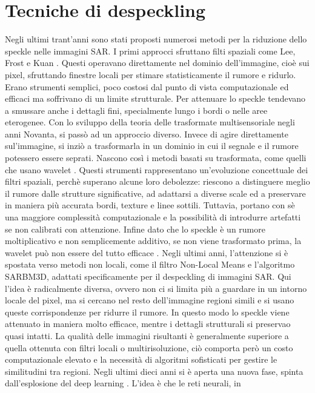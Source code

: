 \section{Tecniche di despeckling}
Negli ultimi trant'anni sono stati proposti numerosi metodi per la riduzione dello speckle nelle immagini SAR.
 I primi approcci sfruttano filti spaziali come Lee, Frost e Kuan \cite{r2024specklenoiseanalysissynthetic}.
Questi operavano direttamente nel dominio dell'immagine, cioè sui pixel, sfruttando finestre locali per stimare
 statisticamente il rumore e ridurlo. Erano strumenti semplici, poco costosi dal punto 
di vista computazionale ed efficaci ma soffrivano di un limite strutturale. Per attenuare lo speckle tendevano a 
smussare anche i dettagli fini, specialmente lungo i bordi o nelle aree eterogenee. 
Con lo sviluppo della teoria delle trasformate multisensoriale negli anni Novanta, si passò ad un approccio diverso. 
Invece di agire direttamente sul'immagine, si inziò a trasformarla in un dominio 
in cui il segnale e il rumore potessero essere seprati. Nascono così i metodi basati su trasformata, come quelli che 
usano wavelet \cite{Argenti2003}. Questi strumenti rappresentano un'evoluzione concettuale dei filtri spaziali,
perchè superano alcune loro debolezze: riescono a distinguere meglio il rumore dalle strutture significative, ad 
adattarsi a diverse scale ed a preservare in maniera più accurata bordi, texture e linee sottili. 
Tuttavia, portano con sè una maggiore complessità computazionale e la possibilità di introdurre artefatti se non 
calibrati con attenzione. Infine dato che lo speckle è un rumore moltiplicativo e non semplicemente 
additivo, se non viene trasformato prima, la wavelet può non essere del tutto efficace \cite{6616053}.
Negli ultimi anni, l’attenzione si è spostata verso metodi non locali, come il filtro Non-Local Means e l’algoritmo 
SARBM3D, adattati specificamente per il despeckling di immagini SAR. Qui l'idea è radicalmente diversa, ovvero non ci si limita più a guardare in un 
intorno locale del pixel, ma si cercano nel resto dell'immagine regioni simili e si usano queste 
corrispondenze per ridurre il rumore. In questo modo lo speckle viene attenuato in maniera molto efficace, mentre 
i dettagli strutturali si preservao quasi intatti. La qualità delle immagini risultanti è generalmente
superiore a quella ottenuta con filtri locali o multirisoluzione, ciò comporta però un costo computazionale elevato 
e la necessità di algoritmi sofisticati per gestire le similitudini tra regioni. Negli ultimi dieci 
anni si è aperta una nuova fase, spinta dall'esplosione del deep learning \cite{DL_SAR}. L'idea è che le reti neurali, in 
